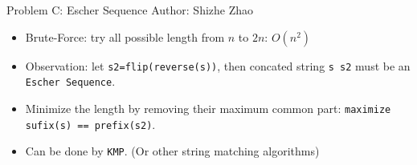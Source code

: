 \begin{frame}{Problem C: Escher Sequence}
\small  Author: Shizhe Zhao

  \begin{itemize}
  \item<2-> Brute-Force: try all possible length from $n$ to $2n$: $O(n^2)$
  \item<3-> Observation: let \texttt{s2=flip(reverse(s))}, then 
  concated string \texttt{s s2} must be an \texttt{Escher Sequence}.
  \item<4-> Minimize the length by removing their maximum common part:
    \texttt{maximize sufix(s) == prefix(s2)}. 
  \item<5-> Can be done by \texttt{KMP}. (Or other string matching algorithms)
  \end{itemize}
\end{frame}
